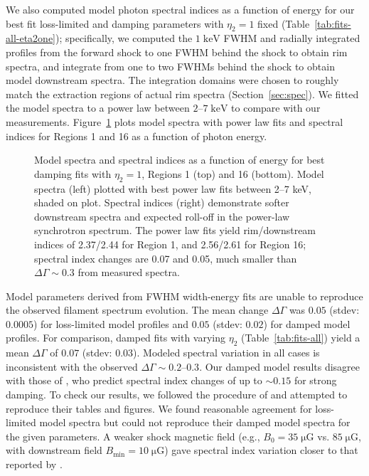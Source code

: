 \documentclass[manuscript]{aastex}  %
\newcommand*{\mt}{\mathrm}
\newcommand*{\unit}[1]{\;\mt{#1}}  %
\newcommand*{\muG}{\unit{\mu G}}
\begin{document}
We also computed model photon spectral indices as a function of energy for our
best fit loss-limited and damping parameters with $\eta_2 = 1$ fixed
(Table~\ref{tab:fits-all-eta2one}); specifically, we computed the $1
\unit{keV}$ FWHM and radially integrated profiles from the forward shock to one
FWHM behind the shock to obtain rim spectra, and integrate from one to two
FWHMs behind the shock to obtain model downstream spectra.  The integration
domains were chosen to roughly match the extraction regions of actual rim
spectra (Section~\ref{sec:spec}).  We fitted the model spectra to a power law
between $2$--$7 \unit{keV}$ to compare with our measurements.
Figure~\ref{fig:specvar} plots model spectra with power law fits and spectral
indices for Regions 1 and 16 as a function of photon energy.

\begin{figure}[h]
    \centering
    \iftoggle{manuscript}{
        \texttt{[image: figures/plt-specvar-1.pdf]} \\
        \texttt{[image: figures/plt-specvar-16.pdf]}
    }{
        \plotone{figures/plt-specvar-1.pdf} \\
        \plotone{figures/plt-specvar-16.pdf}
    }
    \caption{Model spectra and spectral indices as a function of energy for
    best damping fits with $\eta_2 = 1$, Regions 1 (top) and 16 (bottom).
    Model spectra (left) plotted with best power law fits between 2--7 keV,
    shaded on plot.  Spectral indices (right) demonstrate softer downstream
    spectra and expected roll-off in the power-law synchrotron spectrum.
    The power law fits yield rim/downstream indices of 2.37/2.44 for Region 1,
    and 2.56/2.61 for Region 16; spectral index changes are 0.07 and 0.05, much
    smaller than $\Delta\Gamma \sim 0.3$ from measured spectra.
    \label{fig:specvar}}
\end{figure}

Model parameters derived from FWHM width-energy fits are unable to reproduce
the observed filament spectrum evolution.  The mean change $\Delta\Gamma$ was
$0.05$ (stdev: $0.0005$) for loss-limited model profiles and $0.05$ (stdev:
$0.02$) for damped model profiles.  For comparison, damped fits with varying
$\eta_2$ (Table~\ref{tab:fits-all}) yield a mean $\Delta\Gamma$ of $0.07$
(stdev: $0.03$).  Modeled spectral variation in all cases is inconsistent with
the observed $\Delta\Gamma \sim 0.2$--$0.3$.
Our damped model results disagree with those of \citet[][Fig.~4]{rettig2012},
who predict spectral index changes of up to $\sim 0.15$ for strong damping.  To
check our results, we followed the procedure of \citet{rettig2012} and
attempted to reproduce their tables and figures.  We found reasonable agreement
for loss-limited model spectra but could not reproduce their damped model
spectra for the given parameters.  A weaker shock magnetic field (e.g., $B_0 =
35 \muG$ vs. $85 \muG$, with downstream field $B_{\mt{min}} = 10 \muG$) gave
spectral index variation closer to that reported by \citet{rettig2012}.
\end{document}
